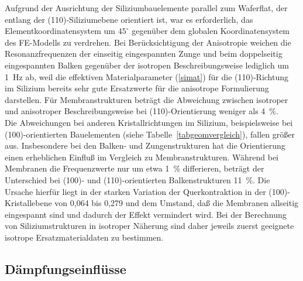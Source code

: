 Aufgrund der Ausrichtung der Siliziumbauelemente parallel
zum Waferflat, der entlang der (110)-Siliziumebene orientiert ist, war es
erforderlich, das Elementkoordinatensystem um $45^{\circ}$
gegenüber dem globalen Koordinatensystem des FE-Modells zu verdrehen.
Bei Berücksichtigung der Anisotropie weichen die Resonanzfrequenzen der
einseitig eingespannten Zunge und beim doppelseitig eingespannten Balken
gegenüber der isotropen Beschreibungsweise lediglich um 1~Hz ab, weil
die effektiven Materialparameter (\ref{simat}) für die (110)-Richtung im
Silizium bereits sehr gute Ersatzwerte für die anisotrope Formulierung
darstellen. Für Membranstrukturen beträgt die Abweichung zwischen
isotroper und anisotroper Beschreibungsweise bei (110)-Orientierung
weniger als 4~\%.\\
Die Abweichungen bei anderen Kristallrichtungen im Silizium, beispielsweise
bei (100)-orientierten Bauelementen (siehe Tabelle~\ref{tabgeomvergleich}),
fallen größer aus. Insbesondere bei den Balken- und Zungenstrukturen hat die
Orientierung einen erheblichen Einfluß im Vergleich zu Membranstrukturen.
Während bei Membranen die Frequenzwerte nur um etwa 1~\% differieren,
beträgt der Unterschied bei (100)- und (110)-orientierten Balkenstrukturen
11~\%. Die Ursache hierfür liegt in der starken Variation der
Querkontraktion in der (100)-Kristallebene von 0,064 bis 0,279 \cite{Heu89}
und dem Umstand, daß die Membranen allseitig eingespannt sind und dadurch
der Effekt vermindert wird. Bei der Berechnung von Siliziumstrukturen
in isotroper Näherung sind daher jeweils zuerst geeignete isotrope
Ersatzmaterialdaten zu bestimmen.



\subsection{Dämpfungseinflüsse}
\label{daempfungseinfluesse}

